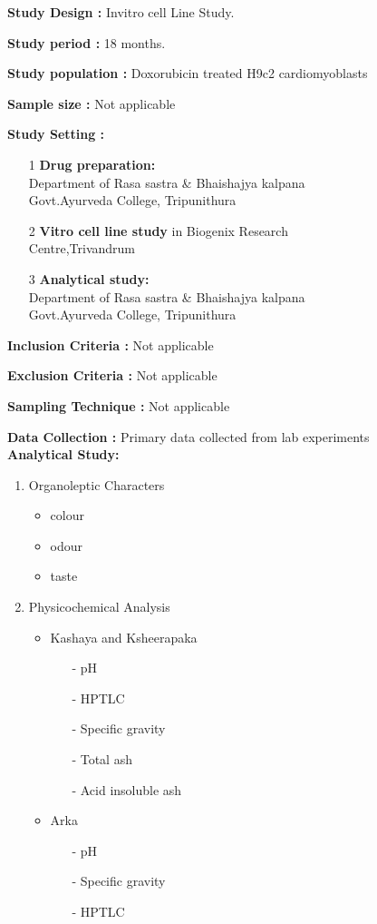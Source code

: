 \documentclass[11pt]{article} %
\begin{document}

\textbf{Study Design :} Invitro cell Line Study.

\textbf{Study period :}  18 months.

\textbf{Study population :} Doxorubicin treated H9c2 cardiomyoblasts

\textbf{Sample size :} Not applicable

\textbf{Study Setting : } 

\begin{itemize}
	\item[1] \textbf{Drug preparation:}\\
	Department of Rasa sastra \&  Bhaishajya kalpana   \\           	             Govt.Ayurveda College, Tripunithura
	\item[2] \textbf{Vitro cell line study} in Biogenix Research \\
	Centre,Trivandrum
	\item[3] \textbf{Analytical study:}\\
	Department of Rasa sastra \& Bhaishajya kalpana \\
	Govt.Ayurveda College, Tripunithura
\end{itemize}

\textbf{Inclusion Criteria :} Not applicable 

\textbf{Exclusion Criteria :} Not applicable 
	
\textbf{Sampling Technique :} Not applicable 

\textbf{Data Collection    :} Primary data collected from lab experiments\\


\textbf{Analytical Study:}

\begin{enumerate}
	\item Organoleptic Characters
	\begin{itemize}
		\item colour
		\item odour
		\item taste
	\end{itemize}
	\item Physicochemical Analysis
	\begin{itemize}
		\item Kashaya and Ksheerapaka
		\begin{itemize}
			\item[-] pH
			\item[-] HPTLC
			\item[-] Specific gravity
			\item[-] Total ash
			\item[-] Acid insoluble ash
		\end{itemize}
		\item Arka
		\begin{itemize}
			\item[-] pH
			\item[-] Specific gravity
			\item[-] HPTLC
		\end{itemize}
	\end{itemize}
\end{enumerate}
\end{document}
